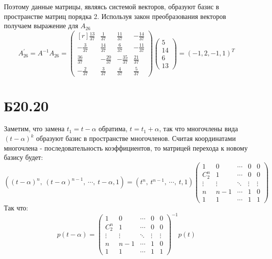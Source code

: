 \documentclass[a4paper,12pt]{article} %
\begin{document}
Поэтому данные матрицы, являясь системой векторов, образуют базис в пространстве матриц порядка 2. Используя закон преобразования векторов получаем выражение для $A_{26}$
$$A^{'}_{26}=A^{-1}A_{26}=\begin{pmatrix*}[r]
    \frac{13}{37}&\frac{1}{37}&\frac{11}{37}&-\frac{14}{37}\\
    -\frac{3}{37}&\frac{14}{37}&\frac{6}{37}&-\frac{11}{37}\\
    \frac{36}{37}&-\frac{20}{37}&-\frac{35}{37}&\frac{21}{37}\\
    -\frac{2}{37}&\frac{3}{37}&\frac{4}{37}&\frac{5}{37}
\end{pmatrix*}\begin{pmatrix*}
    5\\
    14\\
    6\\
    13
\end{pmatrix*}=(-1,2,-1,1)^{T}$$
\section*{Б20.20}
Заметим, что замена $t_1=t-\alpha$ обратима, $t=t_1+
\alpha$, так что многочлены вида $(t-
\alpha)^k$ образуют базис в пространстве многочленов.
Считая координатами многочлена - последовательность коэффициентов, то матрицей перехода к новому базису будет:
$$((t-\alpha)^{n},\ (t-\alpha)^{n-1},\ \cdots,\ t-\alpha, 1)=
(t^{n},\ t^{n-1},\ \cdots,\ t, 1)
\begin{pmatrix*}
    1&0&\cdots&0&0\\
    C^{n}_{2}&1&\cdots&0&0\\
    \vdots&\vdots&\ddots&\vdots&\vdots\\
    n&n-1&\cdots&1&0\\
    1&1&\cdots&1&1
\end{pmatrix*}
$$
Так что:
$$p(t-\alpha)=
\begin{pmatrix*}
    1&0&\cdots&0&0\\
    C^{n}_{2}&1&\cdots&0&0\\
    \vdots&\vdots&\ddots&\vdots&\vdots\\
    n&n-1&\cdots&1&0\\
    1&1&\cdots&1&1
\end{pmatrix*}^{-1}p(t)
$$
\end{document}
